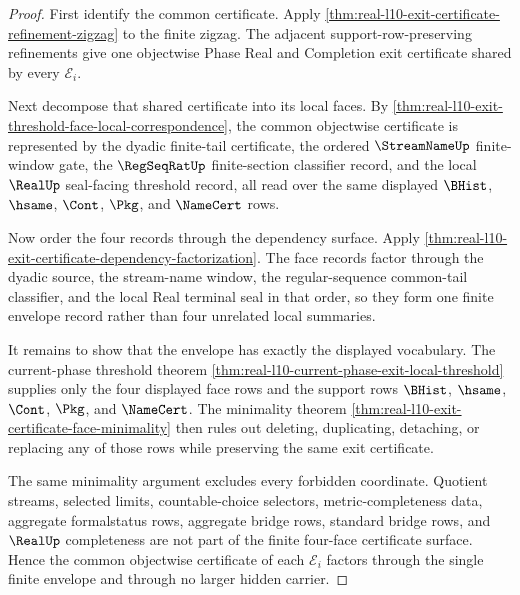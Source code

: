 \begin{proof}
First identify the common certificate. Apply \autoref{thm:real-l10-exit-certificate-refinement-zigzag} to the finite zigzag. The adjacent support-row-preserving refinements give one objectwise Phase Real and Completion exit certificate shared by every $\mathcal E_i$.

Next decompose that shared certificate into its local faces. By \autoref{thm:real-l10-exit-threshold-face-local-correspondence}, the common objectwise certificate is represented by the dyadic finite-tail certificate, the ordered $\StreamNameUp$ finite-window gate, the $\RegSeqRatUp$ finite-section classifier record, and the local $\RealUp$ seal-facing threshold record, all read over the same displayed $\BHist$, $\hsame$, $\Cont$, $\Pkg$, and $\NameCert$ rows.

Now order the four records through the dependency surface. Apply \autoref{thm:real-l10-exit-certificate-dependency-factorization}. The face records factor through the dyadic source, the stream-name window, the regular-sequence common-tail classifier, and the local Real terminal seal in that order, so they form one finite envelope record rather than four unrelated local summaries.

It remains to show that the envelope has exactly the displayed vocabulary. The current-phase threshold theorem \autoref{thm:real-l10-current-phase-exit-local-threshold} supplies only the four displayed face rows and the support rows $\BHist$, $\hsame$, $\Cont$, $\Pkg$, and $\NameCert$. The minimality theorem \autoref{thm:real-l10-exit-certificate-face-minimality} then rules out deleting, duplicating, detaching, or replacing any of those rows while preserving the same exit certificate.

The same minimality argument excludes every forbidden coordinate. Quotient streams, selected limits, countable-choice selectors, metric-completeness data, aggregate formalstatus rows, aggregate bridge rows, standard bridge rows, and $\RealUp$ completeness are not part of the finite four-face certificate surface. Hence the common objectwise certificate of each $\mathcal E_i$ factors through the single finite envelope and through no larger hidden carrier.
\end{proof}

